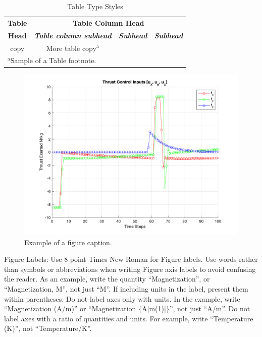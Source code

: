 \documentclass[conference, tikz]{IEEEtran}
\begin{document}
\begin{table}[htbp]
\caption{Table Type Styles}
\begin{center}
\begin{tabular}{|c|c|c|c|}
\hline
\textbf{Table}&\multicolumn{3}{|c|}{\textbf{Table Column Head}} \\
\cline{2-4} 
\textbf{Head} & \textbf{\textit{Table column subhead}}& \textbf{\textit{Subhead}}& \textbf{\textit{Subhead}} \\
\hline
copy& More table copy$^{\mathrm{a}}$& &  \\
\hline
\multicolumn{4}{l}{$^{\mathrm{a}}$Sample of a Table footnote.}
\end{tabular}
\label{tab1}
\end{center}
\end{table}

\begin{figure}[htbp]
\centerline{\includegraphics{Figures/Constrained_input_plot.png}}
\caption{Example of a figure caption.}
\label{fig}
\end{figure}

Figure Labels: Use 8 point Times New Roman for Figure labels. Use words 
rather than symbols or abbreviations when writing Figure axis labels to 
avoid confusing the reader. As an example, write the quantity 
``Magnetization'', or ``Magnetization, M'', not just ``M''. If including 
units in the label, present them within parentheses. Do not label axes only 
with units. In the example, write ``Magnetization (A/m)'' or ``Magnetization 
\{A[m(1)]\}'', not just ``A/m''. Do not label axes with a ratio of 
quantities and units. For example, write ``Temperature (K)'', not 
``Temperature/K''.
\end{document}
